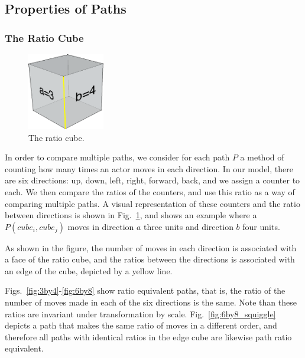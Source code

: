 \subsection{Properties of Paths}
\subsubsection{The Ratio Cube}

\begin{figure}
  \centering
    \includegraphics[width=0.3\textwidth]{./figures/ratioCube_3_4}
      \caption{The ratio cube.}
      \label{fig:ratioCube}
\end{figure}
In order to compare multiple paths, we consider for each path $P$ a method of counting how many times an actor moves in each direction.  
In our model, there are six directions: up, down, left, right, forward, back, and we assign a counter to each.
We then compare the ratios of the counters, and use this ratio as a way of comparing multiple paths.
A visual representation of these counters and the ratio between directions is shown in Fig.~\ref{fig:ratioCube}, and shows an example where a $P(cube_i, cube_j)$ moves in direction $a$ three units and direction $b$ four units.

As shown in the figure, the number of moves in each direction is associated with a face of the ratio cube, and the ratios between the directions is associated with an edge of the cube, depicted by a yellow line.


Figs.~\ref{fig:3by4}-\ref{fig:6by8} show ratio equivalent paths, that is, the ratio of the number of moves made in each of the six directions is the same.
Note than these ratios are invariant under transformation by scale.
Fig.~\ref{fig:6by8_squiggle} depicts a path that makes the same ratio of moves in a different order, and therefore all paths with identical ratios in the edge cube are likewise path ratio equivalent.


